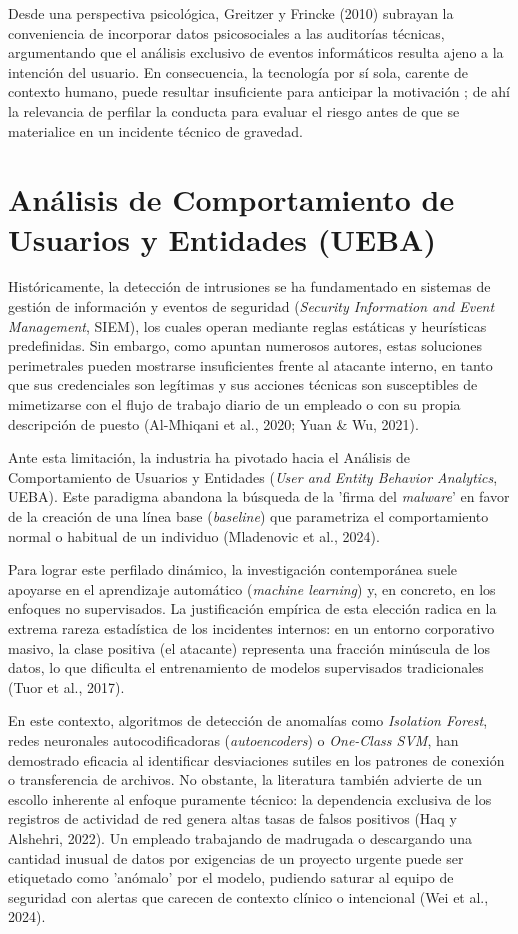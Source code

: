 \documentclass[IB]{TFUOC}%
\begin{document}
\medskip
\noindent Desde una perspectiva psicológica, Greitzer y Frincke (2010) subrayan la conveniencia de incorporar datos psicosociales a las auditorías técnicas, argumentando que el análisis exclusivo de eventos informáticos resulta ajeno a la intención del usuario. En consecuencia, la tecnología por sí sola, carente de contexto humano, puede resultar insuficiente para anticipar la motivación ; de ahí la relevancia de perfilar la conducta para evaluar el riesgo antes de que se materialice en un incidente técnico de gravedad.

\section{Análisis de Comportamiento de Usuarios y Entidades (UEBA)}
Históricamente, la detección de intrusiones se ha fundamentado en sistemas de gestión de información y eventos de seguridad (\textit{Security Information and Event Management}, SIEM), los cuales operan mediante reglas estáticas y heurísticas predefinidas. Sin embargo, como apuntan numerosos autores, estas soluciones perimetrales pueden mostrarse insuficientes frente al atacante interno, en tanto que sus credenciales son legítimas y sus acciones técnicas son susceptibles de mimetizarse con el flujo de trabajo diario de un empleado o con su propia descripción de puesto (Al-Mhiqani et al., 2020; Yuan \& Wu, 2021).

\medskip
\noindent Ante esta limitación, la industria ha pivotado hacia el Análisis de Comportamiento de Usuarios y Entidades (\textit{User and Entity Behavior Analytics}, UEBA). Este paradigma abandona la búsqueda de la 'firma del \textit{malware}' en favor de la creación de una línea base (\textit{baseline}) que parametriza el comportamiento normal o habitual de un individuo (Mladenovic et al., 2024). 

\medskip
\noindent Para lograr este perfilado dinámico, la investigación contemporánea suele apoyarse en el aprendizaje automático (\textit{machine learning}) y, en concreto, en los enfoques no supervisados. La justificación empírica de esta elección radica en la extrema rareza estadística de los incidentes internos: en un entorno corporativo masivo, la clase positiva (el atacante) representa una fracción minúscula de los datos, lo que dificulta el entrenamiento de modelos supervisados tradicionales (Tuor et al., 2017). 

\medskip
\noindent En este contexto, algoritmos de detección de anomalías como \textit{Isolation Forest}, redes neuronales autocodificadoras (\textit{autoencoders}) o \textit{One-Class SVM}, han demostrado eficacia al identificar desviaciones sutiles en los patrones de conexión o transferencia de archivos. No obstante, la literatura también advierte de un escollo inherente al enfoque puramente técnico: la dependencia exclusiva de los registros de actividad de red genera altas tasas de falsos positivos (Haq y Alshehri, 2022). Un empleado trabajando de madrugada o descargando una cantidad inusual de datos por exigencias de un proyecto urgente puede ser etiquetado como 'anómalo' por el modelo, pudiendo saturar al equipo de seguridad con alertas que carecen de contexto clínico o intencional (Wei et al., 2024).
\end{document}
